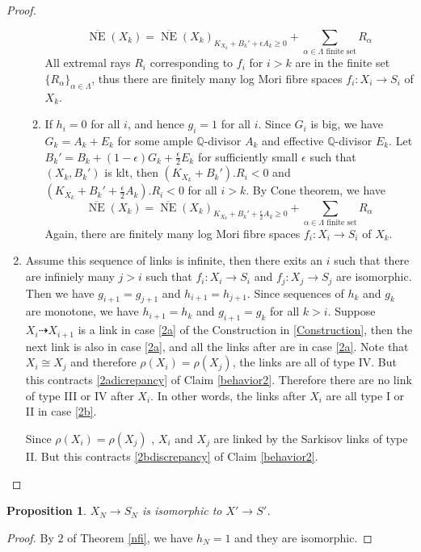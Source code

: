 \documentclass{article}
\newtheorem{prop}[defn]{Proposition}
\begin{document}
\begin{proof}
\begin{enumerate}
\begin{enumerate}
  \[
    \overline{\operatorname{NE}}(X_{k})=\overline{\operatorname{NE}}(X_{k})_{K_{X_{k}}+B_{k}'+\epsilon A_{k}\geqslant 0} +\sum_{\alpha \in\Lambda\text{ finite set}}R_{\alpha}
  \]
  All extremal rays $R_{i}$ corresponding to $f_{i}$ for $i>k$ are in the finite set $\{R_{\alpha}\}_{\alpha \in \Lambda} $, thus there are finitely many log Mori fibre spaces $f_{i}:X_{i}\to S_{i}$ of $X_{k}$.
\item If $h_{i}=0$ for all $i$, and hence $g_{i}=1$ for all $i$. Since $G_{i}$ is big, we have $G_{k}=A_{k}+E_{k}$ for some ample $\mathbb{Q}$-divisor $A_{k}$ and effective $\mathbb{Q}$-divisor $E_{k}$. Let $B_{k}'=B_{k}+(1-\epsilon)G_{k}+\frac{\epsilon}{2} E_{k}$ for sufficiently small $\epsilon$ such that $(X_{k},B_{k}')$ is klt, then $(K_{X_{k}}+B_{k}').R_{i}<0$ and $(K_{X_{k}}+B_{k}'+\frac{\epsilon}{2} A_{k}).R_{i}<0$ for all $i>k$. By Cone theorem, we have 
\[
    \overline{\operatorname{NE}}(X_{k})=\overline{\operatorname{NE}}(X_{k})_{K_{X_{k}}+B_{k}'+\frac{\epsilon}{2}A_{k}\geqslant 0} +\sum_{\alpha \in\Lambda\text{ finite set}}R_{\alpha}
  \]
  Again, there are finitely many log Mori fibre spaces $f_{i}:X_{i}\to S_{i}$ of $X_{k}$.

\end{enumerate}
\item Assume this sequence of links is infinite, then there exits an  $i$ such that there are infiniely many $j>i$ such that $f_{i}:X_{i}\to S_{i}  $ and $f_{j}:X_{j}\to S_{j}$ are isomorphic. Then we have $g_{i+1}=g_{j+1}$ and $h_{i+1}=h_{j+1}$. Since sequences of $h_{k}$ and $g_{k}$ are monotone, we have $h_{i+1}=h_{k}$ and  $g_{i+1}=g_{k}$ for all $k>i$. Suppose $X_{i}\dashrightarrow X_{i+1}$ is a link in case \ref{2a} of the Construction in \ref{Construction}, then the next link is also in case \ref{2a}, and all the links after are in case \ref{2a}. Note that $X_{i}\cong X_{j}$ and therefore $\rho(X_{i})=\rho(X_{j})$, the links are all of type IV. But this contracts  \ref{2adicrepancy} of Claim \ref{behavior2}. Therefore there are no link of type III or IV after $X_{i}$. In other words, the links after $X_{i}$ are all type I or II in case \ref{2b}.

  Since $\rho(X_{i})= \rho(X_{j})$ , $X_{i}$  and $X_{j}$ are linked by  the Sarkisov links of type II. But this contracts  \ref{2bdiscrepancy} of  Claim \ref{behavior2}.
\end{enumerate}  
\end{proof}
\begin{prop}\label{nfi2}
$X_{N}\to S_{N}$ is isomorphic to $X'\to S'$. 
\end{prop}
\begin{proof}
  By $2$ of Theorem \ref{nfi}, we have $h_{N}=1$ and they are isomorphic.
\end{proof}
\end{document}
